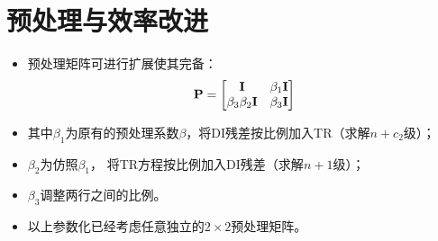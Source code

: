 \documentclass[aspectratio=169,serif]{beamer} %
\begin{document}



\section{预处理与效率改进}

\begin{frame}{\secname}
  \begin{itemize}
    \item 预处理矩阵可进行扩展使其完备：
          \begin{equation}
            \mathbf{P} = \begin{bmatrix}
              \mathbf{I}                & \beta_1 \mathbf{I} \\
              \beta_3\beta_2 \mathbf{I} & \beta_3 \mathbf{I} \\
            \end{bmatrix}
          \end{equation}
    \item 其中$\beta_1$为原有的预处理系数$\beta$，将DI残差按比例加入TR（求解$n+c_2$级）；
    \item $\beta_2$为仿照$\beta_1$，
          将TR方程按比例加入DI残差（求解$n+1$级）；
    \item $\beta_3$调整两行之间的比例。
    \item 以上参数化已经考虑任意独立的$2\times 2$预处理矩阵。
  \end{itemize}
\end{frame}
\end{document}
